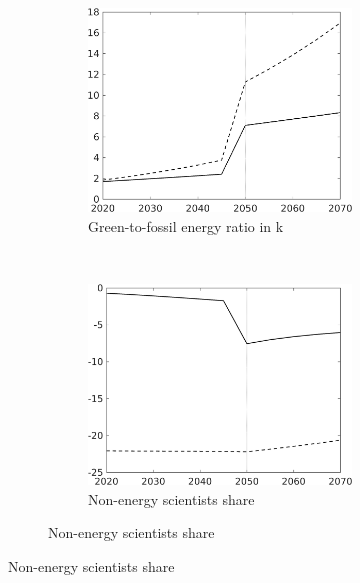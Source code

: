 \begin{figure}[h!!!]
\begin{subfigure}[]{1\textwidth}
\vspace{3mm}
\begin{subfigure}[]{0.4\textwidth}
				\caption{Green-to-fossil energy ratio in k}
	\includegraphics[width=1\textwidth]{../../codding_model/own_basedOnFried/optimalPol_010922_revision/figures/all_13Sept22_Tplus30/GFF_PercentageLFDyn_Target_regime4_knspil0_spillover0_noskill0_sep0_xgrowth0_PV1_etaa0.79_lgd0.png}
\end{subfigure}
\begin{minipage}[]{0.1\textwidth}
	\ 
\end{minipage}
\begin{subfigure}[]{0.4\textwidth}
			\caption{ Non-energy scientists share}
	\includegraphics[width=1\textwidth]{../../codding_model/own_basedOnFried/optimalPol_010922_revision/figures/all_13Sept22_Tplus30/snS_PercentageLFDyn_Target_regime4_knspil0_spillover0_noskill0_sep0_xgrowth0_PV1_etaa0.79_lgd0.png}
\end{subfigure}
\end{subfigure}


\end{figure}
